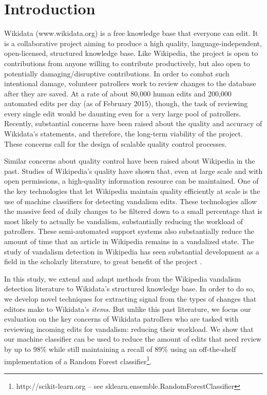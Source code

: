 \documentclass{sig-alternate}
\begin{document}

\printccsdesc

\section{Introduction}
Wikidata (www.wikidata.org) is a free knowledge base that everyone can edit.  It is a collaborative project aiming to produce a high quality, language-independent, open-licensed, structured knowledge base.  Like Wikipedia, the project is open to contributions from anyone willing to contribute productively, but also open to potentially damaging/disruptive contributions. In order to combat such intentional damage, volunteer patrollers work to review changes to the database after they are saved. At a rate of about 80,000 human edits and 200,000 automated edits per day (as of February 2015), though, the task of reviewing every single edit would be daunting even for a very large pool of patrollers. Recently, substantial concerns have been raised about the quality and accuracy of Wikidata's statements\cite{kolbe:whither}, and therefore, the long-term viability of the project.  These concerns call for the design of scalable quality control processes.

Similar concerns about quality control have been raised about Wikipedia in the past\cite{giles:internet}.  Studies of Wikipedia's quality have shown that, even at large scale and with open permissions, a high-quality information resource can be maintained\cite{giles:internet, stvilia:information}.  One of the key technologies that let Wikipedia maintain quality efficiently at scale is the use of machine classifiers for detecting vandalism edits. These technologies allow the massive feed of daily changes to be filtered down to a small percentage that is most likely to actually be vandalism, substantially reducing the workload of patrollers\cite{geiger:levee, geiger:work}.  These semi-automated support systems also substantially reduce the amount of time that an article in Wikipedia remains in a vandalized state\cite{geiger:levee}.  The study of vandalism detection in Wikipedia has seen substantial development as a field in the scholarly literature, to great benefit of the project \cite{wang:got, harpalani:language, adler:detecting, adler:wikipedia}.

In this study, we extend and adapt methods from the Wikipedia vandalism detection literature to Wikidata's structured knowledge base.  In order to do so, we develop novel techniques for extracting signal from the types of changes that editors make to Wikidata's \textit{items}. But unlike this past literature, we focus our evaluation on the key concerns of Wikidata patrollers who are tasked with reviewing incoming edits for vandalism: reducing their workload. We show that our machine classifier can be used to reduce the amount of edits that need review by up to 98\% while still maintaining a recall of 89\% using an off-the-shelf implementation of a Random Forest classifier\cite{breiman:random}\footnote{http://scikit-learn.org -- see sklearn.ensemble.RandomForestClassifier}.
\end{document}
